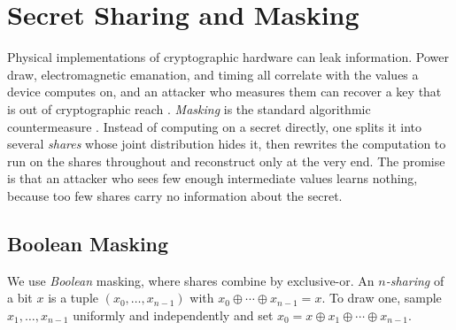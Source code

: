 

\section{Secret Sharing and Masking}
\label{sec:secret-sharing}

Physical implementations of cryptographic hardware can leak information. Power draw, electromagnetic
emanation, and timing all correlate with the values a device computes on, and an
attacker who measures them can recover a key that is out of cryptographic reach
\parencite{kocher1999differential}. \emph{Masking} is the standard algorithmic
countermeasure \parencite{chari1999towards}. Instead of computing on a secret
directly, one splits it into several \emph{shares} whose joint distribution hides
it, then rewrites the computation to run on the shares throughout and reconstruct
only at the very end. The promise is that an attacker who sees few enough
intermediate values learns nothing, because too few shares carry no information
about the secret.

  \subsection{Boolean Masking}
  \label{sec:boolean-masking}

  We use \emph{Boolean} masking, where shares combine by exclusive-or. An
  \emph{$n$-sharing} of a bit $x$ is a tuple
  $(x_0, \dots, x_{n-1})$ with $x_0 \oplus \cdots \oplus x_{n-1} = x$. To draw one,
  sample $x_1, \dots, x_{n-1}$ uniformly and independently and set
  $x_0 = x \oplus x_1 \oplus \cdots \oplus x_{n-1}$.

